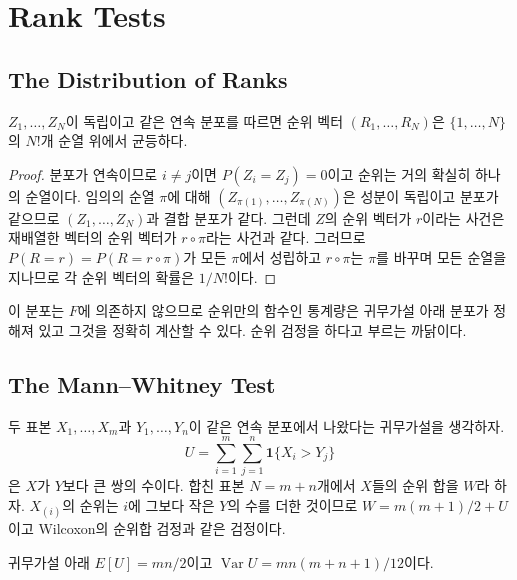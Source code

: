 \section{Rank Tests}
\label{sec:rank-tests}

\subsection{The Distribution of Ranks}

\begin{proposition}
\label{prop:rank-uniform}
$Z_1,\dots,Z_N$이 독립이고 같은 연속 분포를 따르면 순위 벡터 $(R_1,\dots,R_N)$은 $\{1,\dots,N\}$의 $N!$개 순열 위에서 균등하다.
\end{proposition}

\begin{proof}
분포가 연속이므로 $i\ne j$이면 $P(Z_i=Z_j)=0$이고 순위는 거의 확실히 하나의 순열이다. 임의의 순열 $\pi$에 대해 $(Z_{\pi(1)},\dots,Z_{\pi(N)})$은 성분이 독립이고 분포가 같으므로 $(Z_1,\dots,Z_N)$과 결합 분포가 같다. 그런데 $Z$의 순위 벡터가 $r$이라는 사건은 재배열한 벡터의 순위 벡터가 $r\circ\pi$라는 사건과 같다. 그러므로 $P(R=r)=P(R=r\circ\pi)$가 모든 $\pi$에서 성립하고 $r\circ\pi$는 $\pi$를 바꾸며 모든 순열을 지나므로 각 순위 벡터의 확률은 $1/N!$이다.
\end{proof}

이 분포는 $F$에 의존하지 않으므로 순위만의 함수인 통계량은 귀무가설 아래 분포가 정해져 있고 그것을 정확히 계산할 수 있다. 순위 검정을 하다고 부르는 까닭이다.

\subsection{The Mann--Whitney Test}

두 표본 $X_1,\dots,X_m$과 $Y_1,\dots,Y_n$이 같은 연속 분포에서 나왔다는 귀무가설을 생각하자. 
\[
U=\sum_{i=1}^m\sum_{j=1}^n\mathbf 1\{X_i>Y_j\}
\]
은 $X$가 $Y$보다 큰 쌍의 수이다\cite{mann1947}. 합친 표본 $N=m+n$개에서 $X$들의 순위 합을 $W$라 하자. $X_{(i)}$의 순위는 $i$에 그보다 작은 $Y$의 수를 더한 것이므로 $W=m(m+1)/2+U$이고 Wilcoxon의 순위합 검정\cite{wilcoxon1945}과 같은 검정이다.

\begin{proposition}
\label{prop:mw-moments}
귀무가설 아래 $E[U]=mn/2$이고 $\operatorname{Var}U=mn(m+n+1)/12$이다.
\end{proposition}

